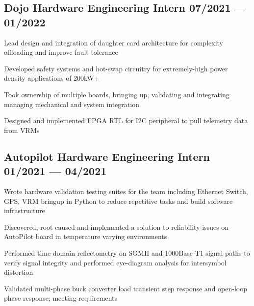 \documentclass[letter,10pt]{article}
\begin{document}

\subsection{{Dojo Hardware Engineering Intern \hfill 07/2021 --- 01/2022}}
\begin{zitemize}
\item Lead design and integration of daughter card architecture for complexity offloading and improve fault tolerance
\item Developed safety systems and hot-swap circuitry for extremely-high power density applications of 200kW+
\item Took ownership of multiple boards, bringing up, validating and integrating managing mechanical and system integration
\item Designed and implemented FPGA RTL for I2C peripheral to pull telemetry data from VRMs
\end{zitemize}
{\color{sectiondivide} \vspace{-0.75em}\hrulefill}

\subsection{{Autopilot Hardware Engineering Intern \hfill 01/2021 --- 04/2021}}
\begin{zitemize}
\item Wrote hardware validation testing suites for the team including Ethernet Switch, GPS, VRM bringup in Python to reduce repetitive tasks and build software infrastructure
\item Discovered, root caused and implemented a solution to reliability issues on AutoPilot board in temperature varying environments
\item Performed time-domain reflectometry on SGMII and 1000Base-T1 signal paths to verify signal integrity and performed eye-diagram analysis for intersymbol distortion
\item Validated multi-phase buck converter load transient step response and open-loop phase response; meeting requirements
\end{zitemize}
{\color{sectiondivide} \vspace{-0.75em}\hrulefill}
\end{document}
